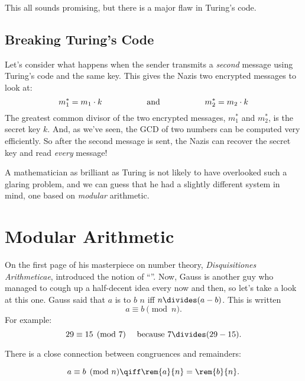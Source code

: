 This all sounds promising, but there is a major flaw in Turing's code.

\subsection{Breaking Turing's Code}

Let's consider what happens when the sender transmits a
\emph{second} message using Turing's code and the same key.  This
gives the Nazis two encrypted messages to look at:
%
\[
m_1^* = m_1 \cdot k
\hspace{0.75in} \text{and} \hspace{0.75in}
m_2^* = m_2 \cdot k
\]
%
The greatest common divisor of the two encrypted messages, $m_1^*$ and
$m_2^*$, is the secret key $k$.  And, as we've seen, the GCD of two
numbers can be computed very efficiently.  So after the second message is
sent, the Nazis can recover the secret key and read \emph{every}
message!

A mathematician as brilliant as Turing is not likely to have
overlooked such a glaring problem, and we can guess that he had a
slightly different system in mind, one based on \emph{modular}
arithmetic.


\section{Modular Arithmetic}
\label{modular_arithmeric_sec}


On the first page of his masterpiece on number theory, \emph{Disquisitiones
  Arithmeticae},  introduced the notion of
``''.  Now, Gauss is another guy who managed to cough up a
half-decent idea every now and then, so let's take a look at this one.
Gauss said that $a$ is  to $b$  $n$ iff $n
\divides (a - b)$.  This is written 
\[
a \equiv b \pmod{n}.
\]
For example:
%
\[
29 \equiv 15 \pmod{7}  \quad\text{ because }  7 \divides (29 - 15).
\]

There is a close connection between congruences and remainders:
\begin{lemma}[Remainder]
\label{lem:conrem}
\[
a \equiv b \pmod{n} \qiff \rem{a}{n} = \rem{b}{n}.
\]
\end{lemma}


